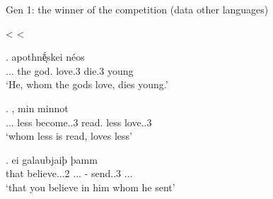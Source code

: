\documentclass[xcolor=dvipsnames,10pt]{beamer}
\begin{document}
\begin{frame}{Gen 1: the winner of the competition (data other languages)}

\pause

 <  < 

\pause

\exg.     apothnḗͅskei néos\\
...\textcolor{LimeGreen}{} the god. love.3\textcolor{LimeGreen}{\scsub{[acc]}} die.3\textcolor{Turquoise}{\scsub{[nom]}} young\\
`He, whom the gods love, dies young.' \label{ex:ag-nom-acc}

\pause

\exg.    , min minnot\\
...\textcolor{red}{} less become..3 read.\textcolor{red}{\scsub{[dat]}} less love..3\textcolor{Turquoise}{\scsub{[nom]}}\\
`whom less is read, loves less' \label{ex:ohg-nom-dat}

\pause

\exg. ei galaubjaiþ þamm   \\
that believe...2\textcolor{red}{\scsub{[dat]}} ...\textcolor{red}{} - {send}..3\textcolor{LimeGreen}{\scsub{[acc]}} ...\\
`that you believe in him whom he sent' \label{ex:gothic-dat-acc}

\end{frame}
\end{document}
